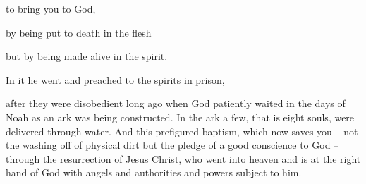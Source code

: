{\par }{\Q to
bring
you
to God,
\par }{\Q by being put to death
in the flesh
\par }{\Q but
by being made alive
in the spirit.
\par }{\Q {}In
it he went
and preached
to the spirits
in
prison,
\par }{\PP {}after
they were disobedient
long ago
when
God
patiently
waited
in
the days
of Noah
as an ark
was being constructed.
In
the ark
a few,
that
is
eight
souls,
were delivered
through
water.
And
this prefigured
baptism,
which
now
saves
you –
not
the washing off
of physical
dirt
but
the pledge
of a good
conscience
to
God
– through
the resurrection
of Jesus
Christ,
who
went
into
heaven
and is
at
the right hand
of God
with angels
and
authorities
and
powers
subject
to him.

}
